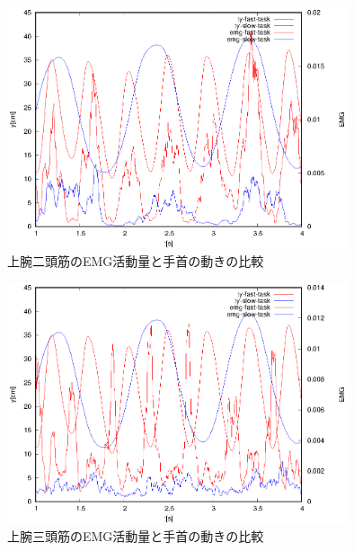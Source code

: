 \documentclass{jsarticle}
\begin{document}
\begin{figure}[htb]
  \begin{center}
    \includegraphics[width=10cm]{hikakudata1.eps}
    \caption{上腕二頭筋のEMG活動量と手首の動きの比較}
    \label{hikaku1}
  \end{center}
\end{figure}

\begin{figure}[htb]
  \begin{center}
    \includegraphics[width=10cm]{hikakudata2.eps}
    \caption{上腕三頭筋のEMG活動量と手首の動きの比較}
    \label{hikaku2}
  \end{center}
\end{figure}
\end{document}

